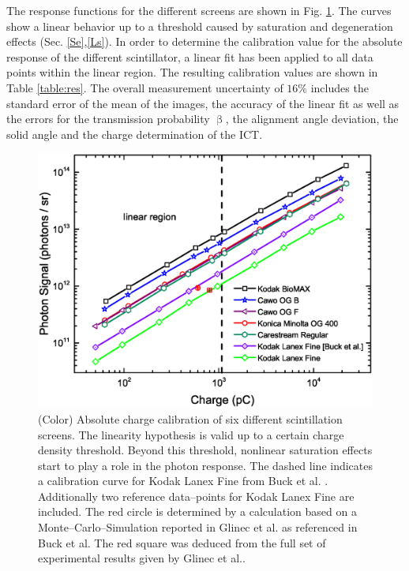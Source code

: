 \documentclass[%
preprint,
amsmath,
amssymb,
aip,
rsi, 
numerical,
floatfix,
]{revtex4-1}
\begin{document}


The response functions for the different screens are shown in Fig. \ref{fig:Calib}.
The curves show a linear behavior up to a threshold caused by saturation and degeneration effects (Sec. \ref{Se},\ref{Ls}).  
In order to determine the calibration value for the absolute response of the different scintillator, a linear fit has been applied to all data points within the linear region.
The resulting calibration values are shown in Table \ref{table:res}. 
The overall measurement uncertainty of $16\%$ includes the standard error of the mean of the images, the accuracy of the linear fit as well as the errors for the transmission probability $\upbeta$, the alignment angle deviation, the solid angle and the charge determination of the ICT. 
   
\begin{figure}
\includegraphics[width=\textwidth]{./Figures/Absolute}%
\caption{\label{fig:Calib}(Color) Absolute charge calibration of six different scintillation screens.
The linearity hypothesis is valid up to a certain charge density threshold. 
Beyond this threshold, nonlinear saturation effects start to play a role in the photon response.
The dashed line indicates a calibration curve for Kodak Lanex Fine from Buck et al.\cite{Buck2010} .
Additionally two reference data--points for Kodak Lanex Fine are included. 
The red circle is determined by a calculation based on a Monte--Carlo--Simulation reported in Glinec et al.\cite{Glinec2006} as referenced in Buck et al. 
The red square was deduced from the full set of experimental results given by Glinec et al.. }
\end{figure}
\end{document}
